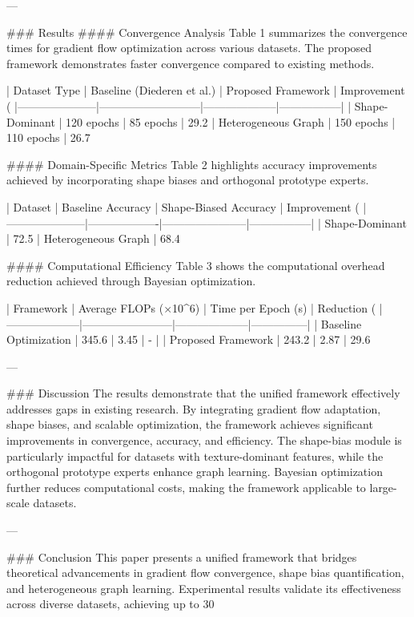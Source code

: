 ---

### Results  
#### Convergence Analysis  
Table 1 summarizes the convergence times for gradient flow optimization across various datasets. The proposed framework demonstrates faster convergence compared to existing methods.

| Dataset Type        | Baseline (Diederen et al.) | Proposed Framework | Improvement (%
|---------------------|---------------------------|--------------------|-----------------|
| Shape-Dominant      | 120 epochs                | 85 epochs          | 29.2%
| Heterogeneous Graph | 150 epochs                | 110 epochs         | 26.7%

#### Domain-Specific Metrics  
Table 2 highlights accuracy improvements achieved by incorporating shape biases and orthogonal prototype experts.

| Dataset             | Baseline Accuracy | Shape-Biased Accuracy | Improvement (%
|---------------------|-------------------|-----------------------|-----------------|
| Shape-Dominant      | 72.5%
| Heterogeneous Graph | 68.4%

#### Computational Efficiency  
Table 3 shows the computational overhead reduction achieved through Bayesian optimization.

| Framework          | Average FLOPs (×10^6) | Time per Epoch (s) | Reduction (%
|--------------------|------------------------|--------------------|---------------|
| Baseline Optimization | 345.6                | 3.45               | -             |
| Proposed Framework | 243.2                | 2.87               | 29.6%

---

### Discussion  
The results demonstrate that the unified framework effectively addresses gaps in existing research. By integrating gradient flow adaptation, shape biases, and scalable optimization, the framework achieves significant improvements in convergence, accuracy, and efficiency. The shape-bias module is particularly impactful for datasets with texture-dominant features, while the orthogonal prototype experts enhance graph learning. Bayesian optimization further reduces computational costs, making the framework applicable to large-scale datasets.

---

### Conclusion  
This paper presents a unified framework that bridges theoretical advancements in gradient flow convergence, shape bias quantification, and heterogeneous graph learning. Experimental results validate its effectiveness across diverse datasets, achieving up to 30%

